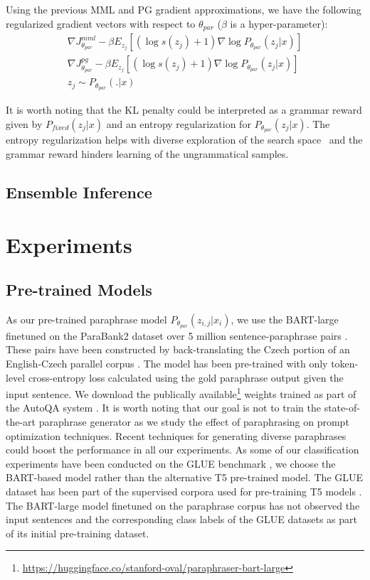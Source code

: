 \documentclass[11pt]{article}
\begin{document}
Using the previous MML and PG gradient approximations, we have the following regularized gradient vectors with respect to $\theta_{par}$ ($\beta$ is a hyper-parameter):
\begin{multline}
\nabla J^{mml}_{\theta_{par}} - \beta E_{z_{j}} [(\log s(z_{j}) + 1) \nabla \log P_{\theta_{par}} (z_{j} | x)] \\
\nabla J^{pg}_{\theta_{par}} - \beta E_{z_{j}} [(\log s(z_{j}) + 1) \nabla \log P_{\theta_{par}} (z_{j} | x)] \\
z_{j} \sim P_{\theta_{par}}(.|x)
\label{lmfp-expect-ppo-gradient}
\end{multline}

It is worth noting that the KL penalty could be interpreted as a grammar reward given by $P_{fixed}(z_{j}|x)$ and an entropy regularization for $P_{\theta_{par}} (z_{j} | x)$. The entropy regularization helps with diverse exploration of the search space~\cite{DBLP:journals/corr/MnihBMGLHSK16} and the grammar reward hinders learning of the ungrammatical samples.

\subsection{Ensemble Inference}

\section{Experiments}

\subsection{Pre-trained Models}
As our pre-trained paraphrase model $P_{\theta_{par}} (z_{i,j} | x_{i})$, we use the BART-large \cite{lewis-etal-2020-bart} finetuned on the ParaBank2 dataset over 5 million sentence-paraphrase pairs \cite{hu-etal-2019-large}. These pairs have been constructed by back-translating the Czech portion of an English-Czech parallel corpus \cite{hu-etal-2019-large}. The model has been pre-trained with only token-level cross-entropy loss calculated using the gold paraphrase output given the input sentence.  We download the publically available\footnote{\url{https://huggingface.co/stanford-oval/paraphraser-bart-large}} weights trained as part of the AutoQA system \cite{xu-etal-2020-autoqa}. It is worth noting that our goal is not to train the state-of-the-art paraphrase generator as we study the effect of paraphrasing on prompt optimization techniques. Recent techniques for generating diverse paraphrases \cite{zhou-bhat-2021-paraphrase} could boost the performance in all our experiments. As some of our classification experiments have been conducted on the GLUE benchmark \cite{DBLP:journals/corr/abs-1804-07461}, we choose the BART-based model rather than the alternative T5 pre-trained model. The GLUE dataset has been part of the supervised corpora used for pre-training T5 models \cite{DBLP:journals/corr/abs-1910-10683}. The BART-large model finetuned on the paraphrase corpus has not observed the input sentences and the corresponding class labels of the GLUE datasets as part of its initial pre-training dataset.
\end{document}
